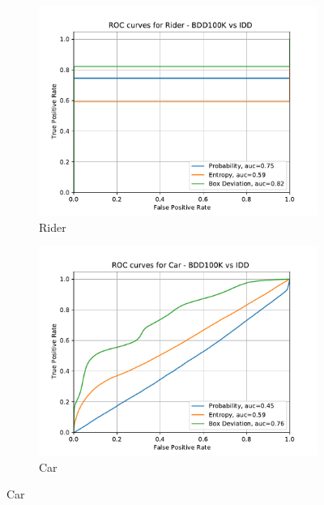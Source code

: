 \begin{figure}[H]
    	\begin{subfigure}[t]{0.495\textwidth}
    		\centering
    		\includegraphics[width=\textwidth]{images/ROC/rider_ROC_bdd_vs_idd_Score_using_bnn.pdf}
    		\caption{Rider}
    	\end{subfigure}
    	\begin{subfigure}[t]{0.495\textwidth}
    		\centering
    		\includegraphics[width=\textwidth]{images/ROC/car_ROC_bdd_vs_idd_Score_using_bnn.pdf}
    		\caption{Car}
    	\end{subfigure}
    	

\end{figure}
